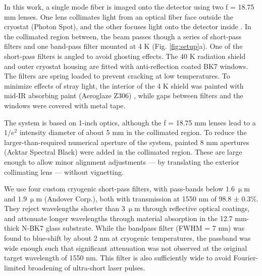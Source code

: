 \documentclass[11pt]{caltech_thesis} %
\begin{document}
In this work, a single mode fiber is imaged onto the detector using two f = 18.75 mm lenses. One lens collimates light from an optical fiber face outside the cryostat (Photon Spot), and the other focuses light onto the detector inside \autocite{Bellei:16}. In the collimated region between, the beam passes though a series of short-pass filters and one band-pass filter mounted at 4 K (Fig. \ref{fig:setup}a). One of the short-pass filters is angled to avoid ghosting effects. The 40 K radiation shield and outer cryostat housing are fitted with anti-reflection coated BK7 windows. The filters are spring loaded to prevent cracking at low temperatures. To minimize effects of stray light, the interior of the 4 K shield was painted with mid-IR absorbing paint (Aeroglaze Z306) \autocite{Persky1999}, while gaps between filters and the windows were covered with metal tape.

The system is based on 1-inch optics, although the f = 18.75 mm lenses lead to a $1/e^2$ intensity diameter of about 5 mm in the collimated region. To reduce the larger-than-required numerical aperture of the system, painted 8 mm apertures (Acktar Spectral Black) were added in the collimated region. These are large enough to allow minor alignment adjustments --- by translating the exterior collimating lens --- without vignetting.

We use four custom cryogenic short-pass filters, with pass-bands below $1.6 \ \mathrm{\upmu m}$ and $1.9 \ \mathrm{\upmu m}$ (Andover Corp.), both with transmission at 1550 nm of 98.8 ± 0.3\%. They reject wavelengths shorter than $3 \ \mathrm{\upmu m}$ through reflective optical coatings, and attenuate longer wavelengths through material absorption in the 12.7 mm-thick N-BK7 glass substrate. While the bandpass filter (FWHM = 7 nm) was found to blue-shift by about 2 nm at cryogenic temperatures, the passband was wide enough such that significant attenuation was not observed at the original target wavelength of 1550 nm. This filter is also sufficiently wide to avoid Fourier-limited broadening of ultra-short laser pulses.
\end{document}
